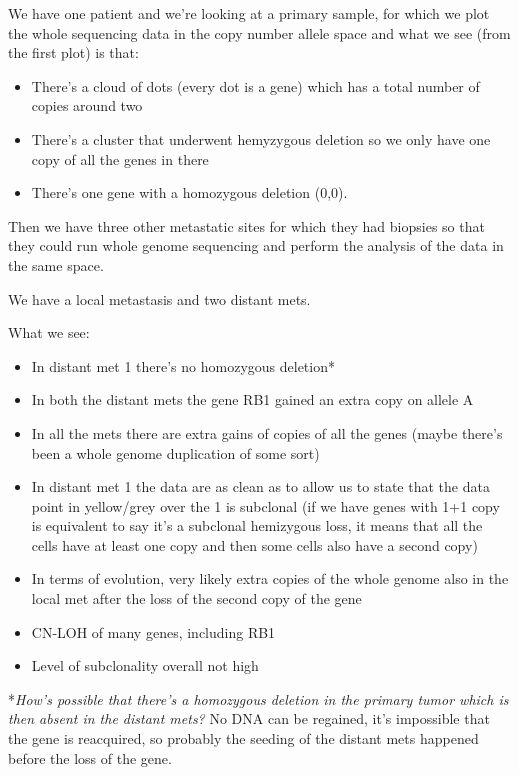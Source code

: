 We have one patient and we're looking at a primary sample, for which we plot the
whole sequencing data in the copy number allele space and what we see (from the
first plot) is that:

\begin{itemize}
\item
  There's a cloud of dots (every dot is a gene) which has a total number of
  copies around two
\item
  There's a cluster that underwent hemyzygous deletion so we only have one copy
  of all the genes in there
\item
  There's one gene with a homozygous deletion (0,0).
\end{itemize}

Then we have three other metastatic sites for which they had biopsies so that
they could run whole genome sequencing and perform the analysis of the data in
the same space.

We have a local metastasis and two distant mets.

What we see:

\begin{itemize}
\item
  In distant met 1 there's no homozygous deletion*
\item
  In both the distant mets the gene RB1 gained an extra copy on allele A
\item
  In all the mets there are extra gains of copies of all the genes (maybe
  there's been a whole genome duplication of some sort)
\item
  In distant met 1 the data are as clean as to allow us to state that the data
  point in yellow/grey over the 1 is subclonal (if we have genes with 1+1 copy
  is equivalent to say it's a subclonal hemizygous loss, it means that all the
  cells have at least one copy and then some cells also have a second copy)
\item
  In terms of evolution, very likely extra copies of the whole genome also in
  the local met after the loss of the second copy of the gene
\item
  CN-LOH of many genes, including RB1
\item
  Level of subclonality overall not high
\end{itemize}

*\emph{How's possible that there's a homozygous deletion in the primary tumor
which is then absent in the distant mets?} No DNA can be regained, it's
impossible that the gene is reacquired, so probably the seeding of the distant
mets happened before the loss of the gene.

